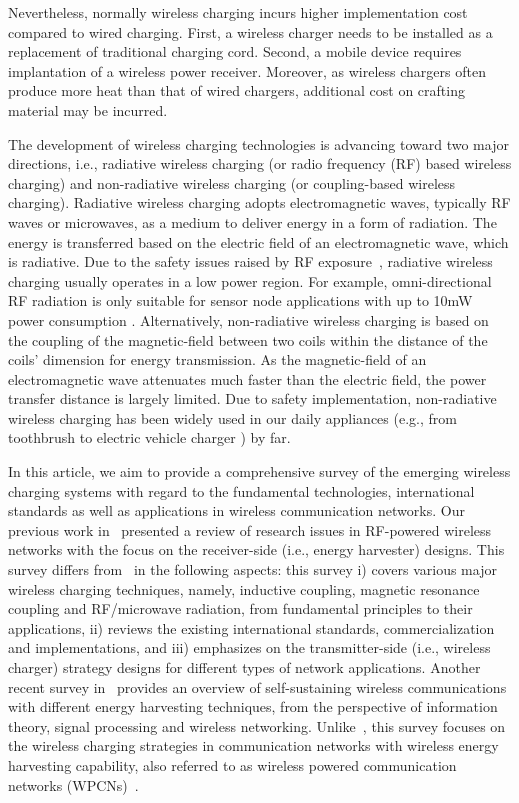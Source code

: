 \documentclass[twocolumn,10pt]{IEEEtran}
\begin{document}
Nevertheless, normally wireless charging incurs  higher implementation cost compared to wired charging. First, a wireless charger needs to be installed as a replacement of traditional charging cord. Second, a mobile device requires implantation of a wireless power receiver. Moreover, as wireless chargers often produce more heat than that of wired chargers, additional cost on crafting material may be incurred. 
 
 
The development of wireless charging technologies is advancing toward two major directions, i.e., radiative wireless charging (or radio frequency (RF) based wireless charging) and non-radiative wireless charging (or coupling-based wireless charging). Radiative wireless charging adopts electromagnetic waves, typically RF waves or microwaves, as a medium to deliver energy in a form of radiation. The energy is transferred based on the electric field of an electromagnetic wave, which is radiative. Due to the safety issues raised by RF exposure~\cite{S.2009Branch}, radiative wireless charging usually operates in a low power region. For example, omni-directional RF radiation is only suitable for sensor node applications with up to 10mW power consumption \cite{L.2013Xie,A.2008Sample}. Alternatively, non-radiative wireless charging is based on the coupling of the magnetic-field between two coils within the distance of the coils' dimension for energy transmission. As the magnetic-field of an electromagnetic wave attenuates much faster than the electric field, the power transfer distance is largely limited. Due to safety implementation, non-radiative wireless charging has been widely used in our daily appliances (e.g., from toothbrush to electric vehicle charger \cite{A.2013Covic}) by far. 


 
In this article, we aim to provide a comprehensive survey of the emerging wireless charging systems with regard to the fundamental technologies, international standards as well as applications in wireless communication networks. 
Our previous work in~\cite{X.LuSurvey} presented a review of research issues in RF-powered wireless networks with the focus on the receiver-side (i.e., energy harvester) designs. This survey differs from~\cite{X.LuSurvey} in the following aspects: this survey i) covers various major wireless charging techniques, namely, inductive coupling, magnetic resonance coupling and RF/microwave radiation, from fundamental principles to their applications, ii) reviews the existing international standards, commercialization and implementations, and iii) emphasizes on the transmitter-side (i.e., wireless charger) strategy designs for different types of network applications. Another recent survey in~\cite{S.2015Ulukus} provides an overview of self-sustaining wireless communications with different energy harvesting techniques, from the perspective of information theory, signal processing and wireless networking. Unlike~\cite{S.2015Ulukus}, this survey focuses on the wireless charging strategies in communication networks with wireless energy harvesting capability, also referred to as wireless powered communication networks (WPCNs)~\cite{S.1408.2335Bi}.
\end{document}
